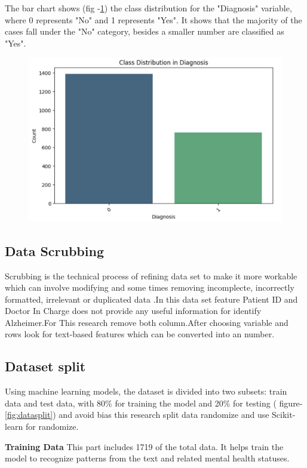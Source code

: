 \documentclass[conference]{IEEEtran} %
\begin{document}
The bar chart shows (fig -\ref{fig:dbdis})  the class distribution for the "Diagnosis" variable, where 0 represents "No" and 1 represents "Yes". It shows that the majority of the cases fall under the "No" category, besides  a smaller number  are classified as "Yes". 
\begin{figure}[ht]
    \centering
    \includegraphics[width=\linewidth]{Fig-02.pdf}
    \caption{}
    \label{fig:dbdis}
\end{figure}
\FloatBarrier

\subsection{Data Scrubbing}
Scrubbing is the technical process of refining data set to make it more workable which can  involve modifying and some times removing incomplecte, incorrectly formatted, irrelevant or duplicated data \cite{ref4}.In this data set feature Patient ID and Doctor In Charge does not provide any useful information for identify Alzheimer.For This research remove both column.After choosing variable and rows look for text-based features which can be converted into an number.
\subsection{Dataset split}
Using machine learning models, the dataset is divided into two subsets: train data and test data, with 80\% for training the model and 20\% for testing ( figure-\ref{fig:datasplit}) and avoid bias this research split data randomize and use Scikit-learn\cite{ref5} for randomize.

\textbf{Training Data }This part includes 1719 of the total data. It helps train the model to recognize patterns from the text and related mental health statuses.
\end{document}
